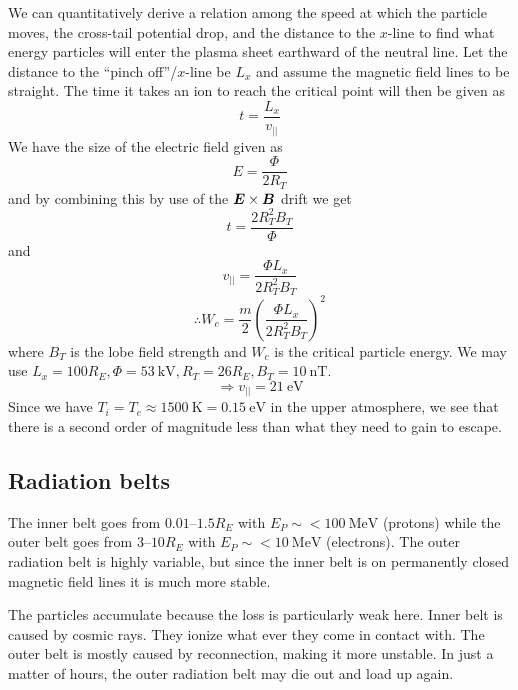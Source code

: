 We can quantitatively derive a relation among the speed at which the particle moves, the cross-tail potential drop, and the distance to the \(x\)-line to find what energy particles will enter the plasma sheet earthward of the neutral line. Let the distance to the ``pinch off''/\(x\)-line be \(L_x\) and assume the magnetic field lines to be straight. The time it takes an ion to reach the critical point will then be given as
\begin{equation*}
    t=\frac{L_x}{v_{||}}
\end{equation*}
We have the size of the electric field given as
\begin{equation*}
    E=\frac{\Phi}{2R_T}
\end{equation*}
and by combining this by use of the \(\boldsymbol{E}\times\boldsymbol{B}\) drift we get
\begin{equation*}
    t=\frac{2R_T^2B_T}{\Phi}
\end{equation*}
and
\begin{equation*}
    v_{||}=\frac{\Phi L_x}{2R_T^2B_T}
\end{equation*}
\begin{equation*}
    \therefore W_c=\frac{m}{2}{\left(\frac{\Phi L_x}{2R_T^2B_T}\right)}^2
\end{equation*}
where \(B_T\) is the lobe field strength and \(W_c\) is the critical particle energy. We may use \(L_x=100R_E, \Phi=\SI{53}{\kilo\volt},R_T=26R_E,B_T=\SI{10}{\nano\tesla}\).
\begin{equation*}
    \Rightarrow v_{||}=\SI{21}{\electronvolt}
\end{equation*}
Since we have \(T_i=T_e\approx\SI{1500}{\kelvin}=\SI{0.15}{\electronvolt}\) in the upper atmosphere, we see that there is a second order of magnitude less than what they need to gain to escape.

\subsection{Radiation belts}
The inner belt goes from \(0.01\)--\(1.5R_E\) with \(E_P\sim <\SI{100}{\mega\electronvolt}\) (protons) while the outer belt goes from \(3\)--\(10R_E\) with \(E_P\sim <\SI{10}{\mega\electronvolt}\) (electrons). The outer radiation belt is highly variable, but since the inner belt is on permanently closed magnetic field lines it is much more stable.

The particles accumulate because the loss is particularly weak here. Inner belt is caused by cosmic rays. They ionize what ever they come in contact with. The outer belt is mostly caused by reconnection, making it more unstable. In just a matter of hours, the outer radiation belt may die out and load up again.

